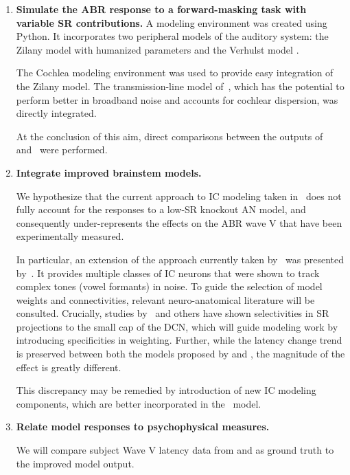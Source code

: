 \begin{enumerate}
	\item \textbf{Simulate the ABR response to a forward-masking task with variable SR contributions.}
	A modeling environment was created using Python.  It incorporates two peripheral models of the auditory system: the Zilany model with humanized parameters \citep{Zilany2014Updated} and the Verhulst model \citep{Verhulst2015Functional}.  

	The Cochlea modeling environment \citep{Rudnicki2014Cochlea} was used to provide easy integration of the Zilany model. The transmission-line model of~\cite{Verhulst2015Functional}, which has the potential to perform better in broadband noise and accounts for cochlear dispersion, was directly integrated.~

	At the conclusion of this aim, direct comparisons between the outputs of~\cite{Zilany2014Updated} and~\cite{Verhulst2015Functional} were performed.

	\item \textbf{Integrate improved brainstem models.}  

	We hypothesize that the current approach to IC modeling taken in~\cite{Verhulst2015Functional} does not fully account for the responses to a low-SR knockout AN model, and consequently under-represents the effects on the ABR wave V that have been experimentally measured.  

	In particular, an extension of the approach currently taken by~\cite{Verhulst2015Functional} was presented by~\cite{Carney2015Speech}.  It provides multiple classes of IC neurons that were shown to track complex tones (vowel formants) in noise.  To guide the selection of model weights and connectivities, relevant neuro-anatomical literature will be consulted.  Crucially, studies by~\cite{Ryugo2008Projections} and others have shown selectivities in SR projections to the small cap of the DCN, which will guide modeling work by introducing specificities in weighting. Further, while the latency change trend is preserved between both the models proposed by \citeauthor{Zilany2014Updated} and \citeauthor{Verhulst2015Functional}, the magnitude of the effect is greatly different.  

	This discrepancy may be remedied by introduction of new IC modeling components, which are better incorporated in the~\cite{Zilany2014Updated} model.
	
	\item \textbf{Relate model responses to psychophysical measures.}  

	We will compare subject Wave V latency data from \citeauthor{Mehraei2015Auditory} and \citeauthor{Mehraei2015Individual} as ground truth to the improved model output.
\end{enumerate}